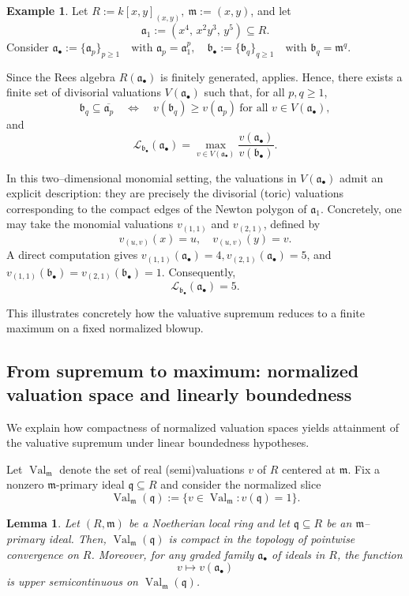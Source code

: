 \documentclass[12pt]{amsart}
\newcommand{\m}{\mathfrak m}
\newcommand{\q}{\mathfrak q}
\renewcommand{\a}{\mathfrak{a}}
\renewcommand{\b}{\mathfrak{b}}
\newcommand{\Loj}{\mathcal{L}} %
\DeclareMathOperator{\Val}{Val}
\newcommand{\abul}{{\a_\bullet}}
\newcommand{\bbul}{{\b_\bullet}}
\theoremstyle{plain}
\newtheorem{lemma}[theorem]{Lemma}
\theoremstyle{definition}
\newtheorem{example}[theorem]{Example}
\numberwithin{equation}{section}
\begin{document}
\begin{example}\label{ex:finite-testing}
	Let $R := k[x,y]_{(x,y)}, \ \m := (x,y)$,
	and let
	\[
	\a_1 := (x^4,\,x^2y^3,\,y^5)\subseteq R.
	\]
	Consider
	$\abul := \{\a_p\}_{p\ge 1} \quad\text{with } \a_p=\a_1^p,
	\quad
	\bbul := \{\b_q\}_{q\ge 1} \quad\text{with } \b_q=\m^q.$
	
	Since the Rees algebra \(R(\abul)\) is finitely generated,  applies. Hence, there exists a finite
	set of divisorial valuations \(V(\abul)\) such that, for all \(p,q\ge 1\),
	\[
	\b_q \subseteq \overline{\a_p}
	\quad\Longleftrightarrow\quad
	v(\b_q)\ge v(\a_p)\ \text{for all } v\in V(\abul),
	\]
	and
	\[
	\Loj_{\bbul}(\abul)
	=\max_{v\in V(\abul)}\frac{v(\abul)}{v(\bbul)}.
	\]
	
	In this two--dimensional monomial setting, the valuations in \(V(\abul)\) admit an
	explicit description: they are precisely the divisorial (toric) valuations
	corresponding to the compact edges of the Newton polygon of \(\a_1\). Concretely,
	one may take the monomial valuations \(v_{(1,1)}\) and \(v_{(2,1)}\), defined by
	\[
	v_{(u,v)}(x)=u, \quad v_{(u,v)}(y)=v.
	\]
	A direct computation gives $v_{(1,1)}(\abul)=4, v_{(2,1)}(\abul)=5$, and $v_{(1,1)}(\bbul)=v_{(2,1)}(\bbul)=1.$	Consequently,
	\[
	\Loj_{\bbul}(\abul)=5.
	\]
	
	This illustrates concretely how the valuative supremum reduces to a finite maximum
	on a fixed normalized blowup.
\end{example}



\subsection{From supremum to maximum: normalized valuation space and linearly boundedness}
We explain how compactness of normalized valuation spaces yields attainment of
the valuative supremum under linear boundedness hypotheses.


Let $\Val_{\m}$ denote the set of real (semi)valuations $v$ of $R$ centered at $\m$.
Fix a nonzero $\m$-primary ideal $\q\subseteq R$ and consider the normalized slice
\[
\Val_{\m}(\q):=\{v\in \Val_{\m}: v(\q)=1\}.
\]

\begin{lemma}\label{lem:compact-slice}
	Let $(R,\m)$ be a Noetherian local ring and let $\q\subseteq R$ be an $\m$--primary ideal.
	Then, $\Val_{\m}(\q)$ is compact in the topology of pointwise convergence on $R$. Moreover, for any graded family $\abul$ of ideals in $R$, the function
	\[
	v \longmapsto v(\abul)
	\]
	is upper semicontinuous on\/ $\Val_{\m}(\q)$. 
\end{lemma}
\end{document}
